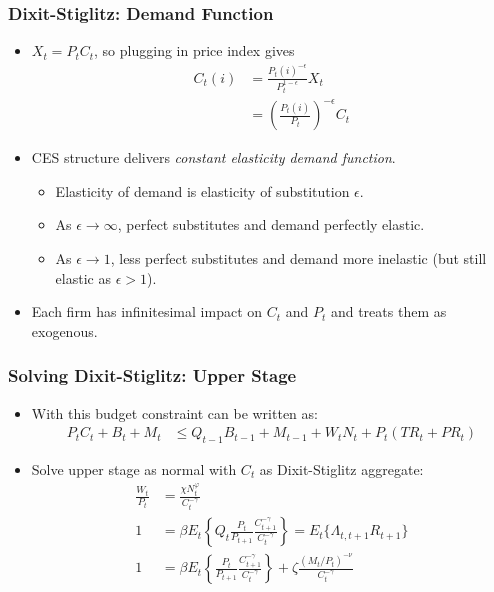 \documentclass[english,xcolor=svgnames]{beamer}
\begin{document}
\begin{frame}
\frametitle{Dixit-Stiglitz: Demand Function}
\begin{itemize}
	\item $X_t=P_tC_t$, so plugging in price index gives
	\begin{align*}C_t(i)&=\frac{P_t(i)^{-\epsilon}}{ P_t^{1-\epsilon}}X_t \\
	&=\left(\frac{P_t(i)}{ P_t}\right)^{-\epsilon} C_t
	\end{align*}
	\item  CES structure delivers \emph{constant elasticity demand function}.
	\begin{itemize}
		\item Elasticity of demand is elasticity of substitution $\epsilon$.
		\item As $\epsilon\rightarrow\infty$, perfect substitutes and demand perfectly elastic.
		\item As $\epsilon\rightarrow 1$, less perfect substitutes and demand more inelastic (but still elastic as $\epsilon>1$).
	\end{itemize}
	\item Each firm has infinitesimal impact on $C_t$ and $P_t$ and treats them as exogenous.
\end{itemize}
\end{frame}


\begin{frame}
\frametitle{Solving Dixit-Stiglitz: Upper Stage
}
\begin{itemize}
	\item With this budget constraint can be written as:
	\begin{align*}
		P_t C_{t}+B_t+M_t&\le Q_{t-1}B_{t-1}+M_{t-1}+W_t N_t + P_{t}(TR_t+PR_t)
	\end{align*}
	\item Solve upper stage as normal with $C_t$ as Dixit-Stiglitz aggregate:
	\begin{align*}
	\frac{W_t}{P_t}&=\frac{\chi N_t^\varphi}{C_t^{-\gamma}} \\
		1&=\beta E_t\left\{Q_t \frac{P_t}{P_{t+1}} \frac{C_{t+1}^{-\gamma}}{C_{t}^{-\gamma}}\right\}=E_t\{\Lambda_{t,t+1}R_{t+1}\} \\
		1&=\beta E_t\left\{\frac{P_t}{P_{t+1}} \frac{C_{t+1}^{-\gamma}}{C_{t}^{-\gamma}}\right\}+\zeta\frac{(M_t/P_t)^{-\nu}}{C_{t}^{-\gamma}}
	\end{align*}
	\end{itemize}
\end{frame}
\end{document}

